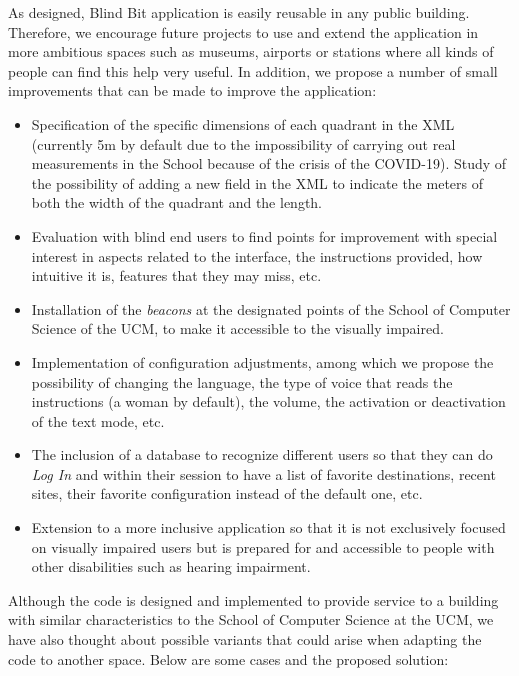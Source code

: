 As designed, Blind Bit application is easily reusable in any public building. Therefore, we encourage future projects to use and extend the application in more ambitious spaces such as museums, airports or stations where all kinds of people can find this help very useful. In addition, we propose a number of small improvements that can be made to improve the application:
\begin{itemize}
	\item Specification of the specific dimensions of each quadrant in the XML (currently 5m by default due to the impossibility of carrying out real measurements in the School because of the crisis of the COVID-19). Study of the possibility of adding a new field in the XML to indicate the meters of both the width of the quadrant and the length.
	
	\item Evaluation with blind end users to find points for improvement with special interest in aspects related to the interface, the instructions provided, how intuitive it is, features that they may miss, etc.
	
	\item Installation of the \textit{beacons} at the designated points of the School of Computer Science of the UCM, to make it accessible to the visually impaired.
	
	\item Implementation of configuration adjustments, among which we propose the possibility of changing the language, the type of voice that reads the instructions (a woman by default), the volume, the activation or deactivation of the text mode, etc.
	
	\item The inclusion of a database to recognize different users so that they can do \textit{Log In} and within their session to have a list of favorite destinations, recent sites, their favorite configuration instead of the default one, etc.
	
	\item Extension to a more inclusive application so that it is not exclusively focused on visually impaired users but is prepared for and accessible to people with other disabilities such as hearing impairment.
	
\end{itemize}
	
Although the code is designed and implemented to provide service to a building with similar characteristics to the School of Computer Science at the UCM, we have also thought about possible variants that could arise when adapting the code to another space. Below are some cases and the proposed solution: 
	
